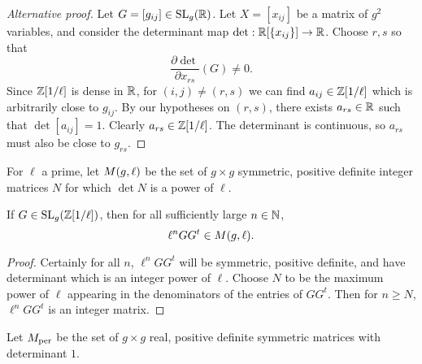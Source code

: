 \documentclass{amsart}
\begin{document}
\begin{proof}[Alternative proof]
  Let $G = [g_{ij}] \in \operatorname{SL}_g(\mathbb{R})$. Let $X = [x_{ij}]$ be a matrix of $g^2$ variables, and consider the determinant map $\det: \mathbb{R}[\{x_{ij}\}] \to \mathbb{R}$. Choose $r,s$ so that
  \[
    \frac{\partial \det}{\partial x_{rs}}(G) \neq 0.
  \]
  Since $\mathbb{Z}[1/\ell]$ is dense in $\mathbb{R}$, for $(i,j) \neq (r,s)$ we can find $a_{ij} \in \mathbb{Z}[1/\ell]$ which is arbitrarily close to $g_{ij}$. By our hypotheses on $(r,s)$, there exists $a_{rs} \in \mathbb{R}$ such that $\det [a_{ij}] = 1$. Clearly $a_{rs} \in \mathbb{Z}[1/\ell]$. The determinant is continuous, so $a_{rs}$ must also be close to $g_{rs}$.
\end{proof}



\begin{definition}
  For $\ell$ a prime, let $M(g,\ell)$ be the set of $g \times g$ symmetric, positive definite integer matrices $N$ for which $\det N$ is a power of $\ell$.
\end{definition}

\begin{lemma}\label{lemma:ggt-spd-detl}
  If $G \in \operatorname{SL}_g(\mathbb{Z}[1/\ell])$, then for all sufficiently large $n \in \mathbb{N}$,
  \[
    \ell^n GG^t \in M(g,\ell).
  \]
\end{lemma}

\begin{proof}
  Certainly for all $n$, $\ell^n GG^t$ will be symmetric, positive definite, and have determinant which is an integer power of $\ell$. Choose $N$ to be the maximum power of $\ell$ appearing in the denominators of the entries of $GG^t$. Then for $n \geq N$, $\ell^n GG^t$ is an integer matrix.
\end{proof}


\begin{definition}
  Let $M_{\textrm{per}}$ be the set of $g \times g$ real, positive definite symmetric matrices  with determinant $1$.
\end{definition}
\end{document}
